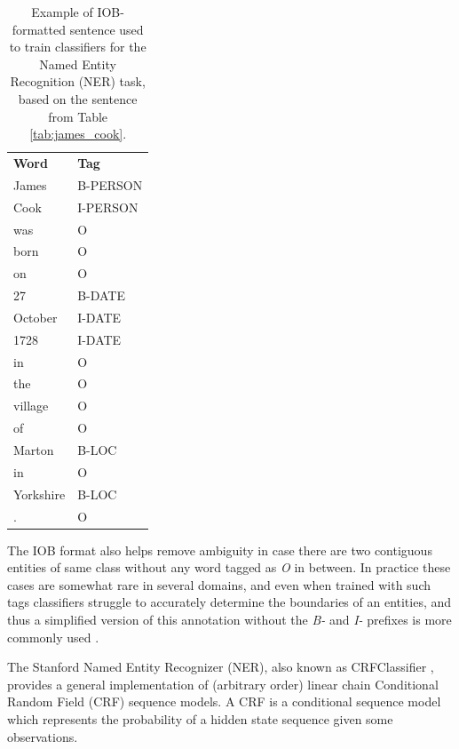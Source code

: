 \documentclass[11pt,a4paper,openright]{memoir}
\begin{document}
\begin{table}[!htbp]
  \centering
    \begin{tabular}{ll}
      \textbf{Word}          & \textbf{Tag} \\
      James                  & B-PERSON \\
      Cook                   & I-PERSON \\
      was                    & O \\
      born                   & O \\
      on                     & O \\
      27                     & B-DATE \\
      October                & I-DATE \\
      1728                   & I-DATE \\
      in                     & O \\
      the                    & O \\
      village                & O \\
      of                     & O \\
      Marton                 & B-LOC \\
      in                     & O \\
      Yorkshire              & B-LOC \\
      .                      & O \\
    \end{tabular}
  \caption[IOB-formatted sentence.]{Example of IOB-formatted sentence used to train classifiers for the Named Entity Recognition (NER) task, based on the sentence from Table \ref{tab:james_cook}.}
  \label{tab:james_cook_iob}
\end{table}

The IOB format also helps remove ambiguity in case there are two contiguous entities of same class without any word tagged as \emph{O} in between. In practice these cases are somewhat rare in several domains, and even when trained with such tags classifiers struggle to accurately determine the boundaries of an entities, and thus a simplified version of this annotation without the \emph{B-} and \emph{I-} prefixes is more commonly used \cite{Surdeanu:2011:CIE:2021153.2021155}.

The Stanford Named Entity Recognizer (NER), also known as CRFClassifier \cite{Finkel:2005:INI:1219840.1219885}, provides a general implementation of (arbitrary order) linear chain Conditional Random Field (CRF) sequence models. A CRF is a conditional sequence model which represents the probability of a hidden state sequence given some observations.
\end{document}
